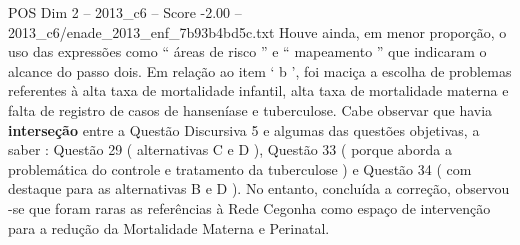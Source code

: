 \begin{textsample}{POS Dim 2 – 2013\_c6 – Score -2.00 – 2013\_c6/enade\_2013\_enf\_7b93b4bd5c.txt}
Houve ainda, em menor proporção, o uso das expressões como “ áreas de risco ” e “ mapeamento ” que indicaram o alcance do passo dois.
Em relação ao item ‘ b ’, foi maciça a escolha de problemas referentes à alta taxa de mortalidade infantil, alta taxa de mortalidade materna e falta de registro de casos de hanseníase e tuberculose.
Cabe observar que havia \textbf{interseção} entre a Questão Discursiva 5 e algumas das questões objetivas, a saber : Questão 29 ( alternativas C e D ), Questão 33 ( porque aborda a problemática do controle e tratamento da tuberculose ) e Questão 34 ( com destaque para as alternativas B e D ).
No entanto, concluída a correção, observou -se que foram raras as referências à Rede Cegonha como espaço de intervenção para a redução da Mortalidade Materna e Perinatal.

\end{textsample}
